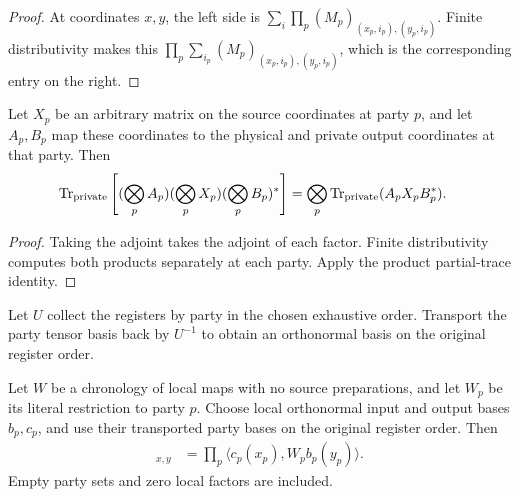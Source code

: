 \begin{proof}\leanok
    At coordinates $x,y$, the left side is
    $\sum_i\prod_p(M_p)_{(x_p,i_p),(y_p,i_p)}$.
    Finite distributivity makes this
    $\prod_p\sum_{i_p}(M_p)_{(x_p,i_p),(y_p,i_p)}$, which is the
    corresponding entry on the right.
\end{proof}

\begin{theorem}
    \label{thm:peps_party_product_conjugation}
    \leanok
    Let $X_p$ be an arbitrary matrix on the source coordinates at party
    $p$, and let $A_p,B_p$ map these coordinates to the physical and
    private output coordinates at that party. Then
    \begin{align}
        \operatorname{Tr}_{\rm private}
          \left[(\bigotimes_p A_p)(\bigotimes_p X_p)
          (\bigotimes_p B_p)^*\right]
        &=\bigotimes_p\operatorname{Tr}_{\rm private}
          (A_pX_pB_p^*).
    \end{align}
\end{theorem}

\begin{proof}\leanok
    Taking the adjoint takes the adjoint of each factor. Finite
    distributivity computes both products separately at each party.
    Apply the product partial-trace identity.
\end{proof}

\begin{definition}
    \label{def:peps_party_grouped_basis}
    \leanok
    Let $U$ collect the registers by party in the chosen exhaustive
    order. Transport the party tensor basis back by $U^{-1}$ to obtain
    an orthonormal basis on the original register order.
\end{definition}

\begin{theorem}
    \label{thm:peps_actual_party_coordinates}
    \leanok
    Let $W$ be a chronology of local maps with no source preparations,
    and let $W_p$ be its literal restriction to party $p$. Choose local
    orthonormal input and output bases $b_p,c_p$, and use their
    transported party bases on the original register order. Then
    \begin{align}
        [W]_{x,y}
        &=\prod_p\langle c_p(x_p),W_pb_p(y_p)\rangle.
    \end{align}
    Empty party sets and zero local factors are included.
\end{theorem}

